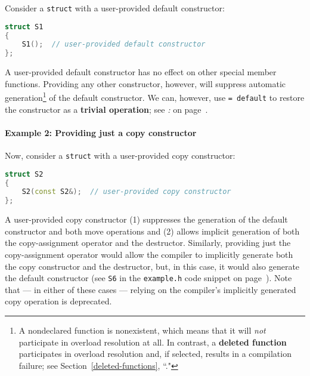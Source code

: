 Consider a \texttt{struct} with a user-provided default constructor:

\begin{lstlisting}[language=C++]
struct S1
{
    S1();  // user-provided default constructor
};
\end{lstlisting}

\noindent A user-provided default constructor has no effect on other special
member functions. Providing any other constructor, however, will
suppress automatic generation{\cprotect\footnote{A nondeclared
function is nonexistent, which means that it will \emph{not}
participate in overload resolution at all. In contrast, a
\textbf{deleted function} participates in overload resolution and, if
selected, results in a compilation failure; see Section~\ref{deleted-functions}, ``."}} of the default constructor. We can, however, use
\texttt{=}~\texttt{default} to restore the constructor as a \textbf{trivial
operation}; see {\it{}: } on page~\pageref{restoring-the-generation-of-a-special-member-function-suppressed-by-another}.

\paragraph[Example 2: Providing just a copy constructor]{Example 2: Providing just a copy constructor}\label{example-2:-providing-just-a-copy-constructor}

Now, consider a \texttt{struct} with a user-provided copy constructor:

\begin{lstlisting}[language=C++]
struct S2
{
    S2(const S2&);  // user-provided copy constructor
};
\end{lstlisting}

\noindent A user-provided copy constructor (1) suppresses the generation of the
default constructor and both move operations and (2) allows implicit
generation of both the copy-assignment operator and the destructor.
Similarly, providing just the copy-assignment operator would allow the
compiler to implicitly generate both the copy constructor and the
destructor, but, in this case, it would also generate the default
constructor (see \texttt{S6} in the \texttt{example.h} code snippet on page~\pageref{default-exampleh-code}). Note that --- in either of these
cases --- relying on the compiler's implicitly generated copy operation
is deprecated.

